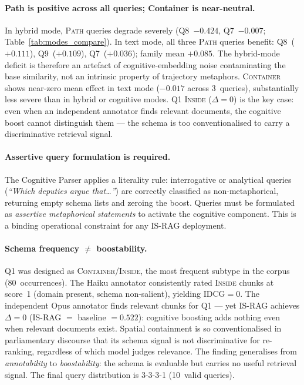 \documentclass[11pt,a4paper]{article}
\begin{document}
\paragraph{Path is positive across all queries; Container is near-neutral.}
In hybrid mode, \textsc{Path} queries degrade severely
(Q8~$-0.424$, Q7~$-0.007$; Table~\ref{tab:modes_compare}).
In text mode, all three \textsc{Path} queries benefit: Q8~($+0.111$),
Q9~($+0.109$), Q7~($+0.036$); family mean $+0.085$.
The hybrid-mode deficit is therefore an artefact of cognitive-embedding
noise contaminating the base similarity, not an intrinsic property of
trajectory metaphors.
\textsc{Container} shows near-zero mean effect in text mode
($-0.017$ across 3~queries), substantially less severe than in hybrid
or cognitive modes.
Q1 \textsc{Inside} ($\Delta{=}0$) is the key case: even when an
independent annotator finds relevant documents, the cognitive boost
cannot distinguish them — the schema is too conventionalised to carry
a discriminative retrieval signal.

\paragraph{Assertive query formulation is required.}
The Cognitive Parser applies a literality rule: interrogative or
analytical queries (\emph{``Which deputies argue that\ldots''}) are
correctly classified as non-metaphorical, returning empty schema lists
and zeroing the boost.
Queries must be formulated as \emph{assertive metaphorical statements}
to activate the cognitive component.
This is a binding operational constraint for any IS-RAG deployment.

\paragraph{Schema frequency $\neq$ boostability.}
Q1 was designed as \textsc{Container}/\textsc{Inside}, the most
frequent subtype in the corpus (80~occurrences).
The Haiku annotator consistently rated \textsc{Inside} chunks at
score~1 (domain present, schema non-salient), yielding IDCG${=}0$.
The independent Opus annotator finds relevant chunks for Q1 — yet
IS-RAG achieves $\Delta{=}0$ (IS-RAG $=$ baseline $= 0.522$):
cognitive boosting adds nothing even when relevant documents exist.
Spatial containment is so conventionalised in parliamentary discourse
that its schema signal is not discriminative for re-ranking, regardless
of which model judges relevance.
The finding generalises from \emph{annotability} to \emph{boostability}:
the schema is evaluable but carries no useful retrieval signal.
The final query distribution is 3-3-3-1 (10~valid queries).
\end{document}
